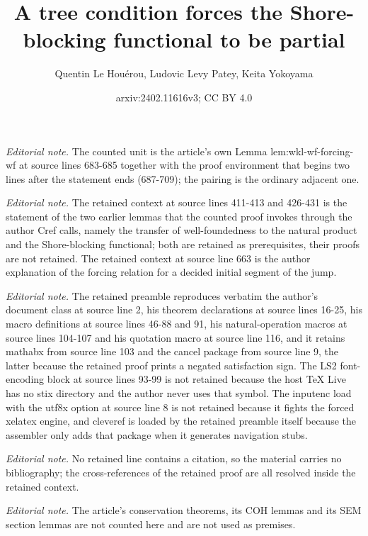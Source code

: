 \documentclass{article}
\title{A tree condition forces the Shore-blocking functional to be partial}
\author{Quentin Le Houérou, Ludovic Levy Patey, Keita Yokoyama}
\date{arxiv:2402.11616v3; CC BY 4.0}
\numberwithin{theorem}{section}
\begin{document}
\maketitle
\noindent\textit{Editorial note.} The counted unit is the article's own Lemma lem:wkl-wf-forcing-wf at source lines 683-685 together with the proof environment that begins two lines after the statement ends (687-709); the pairing is the ordinary adjacent one.\par\medskip
\noindent\textit{Editorial note.} The retained context at source lines 411-413 and 426-431 is the statement of the two earlier lemmas that the counted proof invokes through the author Cref calls, namely the transfer of well-foundedness to the natural product and the Shore-blocking functional; both are retained as prerequisites, their proofs are not retained. The retained context at source line 663 is the author explanation of the forcing relation for a decided initial segment of the jump.\par\medskip
\noindent\textit{Editorial note.} The retained preamble reproduces verbatim the author's document class at source line 2, his theorem declarations at source lines 16-25, his macro definitions at source lines 46-88 and 91, his natural-operation macros at source lines 104-107 and his quotation macro at source line 116, and it retains mathabx from source line 103 and the cancel package from source line 9, the latter because the retained proof prints a negated satisfaction sign. The LS2 font-encoding block at source lines 93-99 is not retained because the host TeX Live has no stix directory and the author never uses that symbol. The inputenc load with the utf8x option at source line 8 is not retained because it fights the forced xelatex engine, and cleveref is loaded by the retained preamble itself because the assembler only adds that package when it generates navigation stubs.\par\medskip
\noindent\textit{Editorial note.} No retained line contains a citation, so the material carries no bibliography; the cross-references of the retained proof are all resolved inside the retained context.\par\medskip
\noindent\textit{Editorial note.} The article's conservation theorems, its COH lemmas and its SEM section lemmas are not counted here and are not used as premises.\par\medskip
\end{document}
